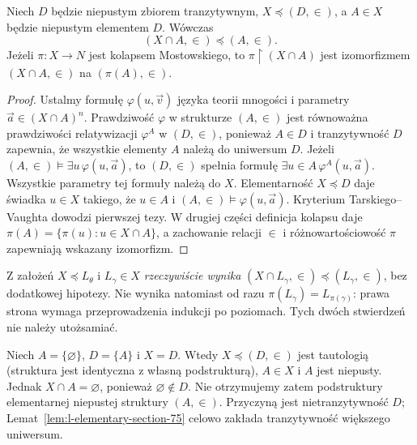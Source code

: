 \begin{lemat}
\label{lem:l-elementary-section-75}
Niech $D$ będzie niepustym zbiorem tranzytywnym,
$X\preccurlyeq(D,\in)$,
a $A\in X$ będzie niepustym elementem $D$.
Wówczas
\[
(X\cap A,\in)\preccurlyeq(A,\in).
\]
Jeżeli $\pi:X\to N$ jest kolapsem Mostowskiego, to
$\pi\restriction(X\cap A)$ jest izomorfizmem
$(X\cap A,\in)$ na $(\pi(A),\in)$.
\end{lemat}
\begin{proof}
Ustalmy formułę $\varphi(u,\vec v)$ języka teorii mnogości
i parametry $\vec a\in(X\cap A)^n$.
Prawdziwość $\varphi$ w strukturze $(A,\in)$ jest
równoważna prawdziwości relatywizacji $\varphi^A$
w $(D,\in)$, ponieważ $A\in D$ i tranzytywność $D$ zapewnia,
że wszystkie elementy $A$ należą do uniwersum $D$.
Jeżeli $(A,\in)\models\exists u\,\varphi(u,\vec a)$,
to $(D,\in)$ spełnia formułę
$\exists u\in A\,\varphi^A(u,\vec a)$.
Wszystkie parametry tej formuły należą do $X$.
Elementarność $X\preccurlyeq D$ daje świadka
$u\in X$ takiego, że $u\in A$ i
$(A,\in)\models\varphi(u,\vec a)$.
Kryterium Tarskiego--Vaughta dowodzi pierwszej tezy.
W drugiej części definicja kolapsu daje
$\pi(A)=\{\pi(u):u\in X\cap A\}$, a zachowanie
relacji $\in$ i różnowartościowość $\pi$ zapewniają
wskazany izomorfizm.
\end{proof}

\begin{uwaga}
\label{rem:l-sections-corrected-75}
Z założeń $X\preccurlyeq L_\theta$ i $L_\gamma\in X$
\emph{rzeczywiście wynika}
$(X\cap L_\gamma,\in)\preccurlyeq(L_\gamma,\in)$,
bez dodatkowej hipotezy. Nie wynika natomiast od razu
$\pi(L_\gamma)=L_{\pi(\gamma)}$:
prawa strona wymaga przeprowadzenia indukcji po poziomach.
Tych dwóch stwierdzeń nie należy utożsamiać.
\end{uwaga}

\begin{przyklad}
\label{ex:l-elementary-section-transitivity-75}
Niech $A=\{\varnothing\}$, $D=\{A\}$ i $X=D$.
Wtedy $X\preccurlyeq(D,\in)$ jest tautologią
(struktura jest identyczna z własną podstrukturą),
$A\in X$ i $A$ jest niepusty. Jednak
$X\cap A=\varnothing$, ponieważ
$\varnothing\notin D$. Nie otrzymujemy zatem
podstruktury elementarnej niepustej struktury
$(A,\in)$. Przyczyną jest nietranzytywność $D$;
Lemat~\ref{lem:l-elementary-section-75}
celowo zakłada tranzytywność większego uniwersum.
\end{przyklad}


